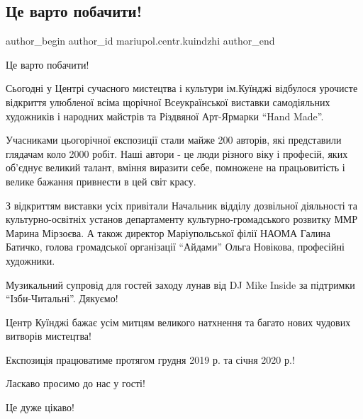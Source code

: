  
 
 
 
 

\subsection{Це варто побачити!}
\label{sec:14_12_2019.fb.mariupol.centr.kuindzhi.1.vystavka_vidkryttja_varto_pobachyty}

\ifcmt
 author_begin
   author_id mariupol.centr.kuindzhi
 author_end
\fi

Це варто побачити!

Сьогодні у Центрі сучасного мистецтва і культури ім.Куїнджі відбулося урочисте
відкриття улюбленої всіма щорічної Всеукраїнської виставки самодіяльних
художників і народних майстрів та Різдвяної Арт-Ярмарки \enquote{Hand Made}.

Учасниками цьогорічної експозиції стали майже 200 авторів, які представили
глядачам коло 2000 робіт. Наші автори - це люди різного віку і професій, яких
об'єднує великий талант, вміння виразити себе, помножене на працьовитість і
велике бажання привнести в цей світ красу.

З відкриттям виставки усіх привітали Начальник відділу дозвільної діяльності та
культурно-освітніх установ департаменту культурно-громадського розвитку ММР
Марина  Мірзоєва.  А також директор Маріупольської філії НАОМА Галина  Батичко,
голова громадської організації \enquote{Айдами} Ольга Новікова, професійні художники.

Музикальний супровід для гостей заходу лунав від DJ Mike Inside за підтримки
\enquote{Ізби-Читальні}. Дякуємо!

Центр Куїнджі бажає усім митцям великого натхнення та  багато нових чудових
витворів мистецтва!

Експозиція працюватиме протягом грудня 2019 р. та січня 2020 р.!

Ласкаво просимо до нас у гості!

Це дуже цікаво!

